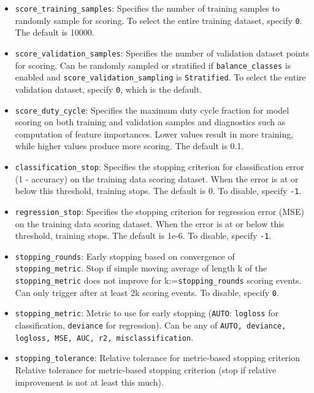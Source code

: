{{{\begin{itemize}
\item \texttt{score\_training\_samples}: Specifies the number of training samples to randomly sample for scoring. To select the entire training dataset, specify \texttt{0}.  The default is 10000.

\item \texttt{score\_validation\_samples}: Specifies the number of validation dataset points for scoring. Can be randomly sampled or stratified if  \texttt{balance\_classes} is enabled and \texttt{score\_validation\_sampling} is \texttt{Stratified}. To select the entire validation dataset, specify \texttt{0}, which is the default.

\item \texttt{score\_duty\_cycle}: Specifies the maximum duty cycle fraction for model scoring on both training and validation samples and diagnostics such as computation of feature importances. Lower values result in more training, while higher values produce more scoring. The default is 0.1.

\item \texttt{classification\_stop}: Specifies the stopping criterion for classification error (1 - accuracy) on the training data scoring dataset.  When the error is at or below this threshold, training stops.  The default is 0.  To disable, specify \texttt{-1}. 

\item \texttt{regression\_stop}: Specifies the stopping criterion for regression error (MSE) on the training data scoring dataset. When the error is at or below this threshold, training stops. The default is 1e-6.  To disable, specify \texttt{-1}.

\item \texttt{stopping\_rounds}: Early stopping based on convergence of \\\texttt{stopping\_metric}. Stop if simple moving average of length k of the \texttt{stopping\_metric} does not improve for k:=\texttt{stopping\_rounds} scoring events. Can only trigger after at least 2k scoring events. To disable, specify \texttt{0}.

\item \texttt{stopping\_metric}: Metric to use for early stopping (\texttt{AUTO}: \texttt{logloss} for classification, \texttt{deviance} for regression). Can be any of \texttt{AUTO, deviance, logloss, MSE, AUC, r2, misclassification}.

\item \texttt{stopping\_tolerance}: Relative tolerance for metric-based stopping criterion Relative tolerance for metric-based stopping criterion (stop if relative improvement is not at least this much).


\end{itemize}}}}
